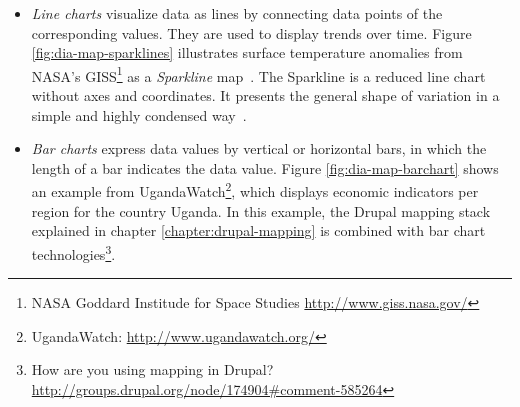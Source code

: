 \begin{itemize}
\begin{itemize}
\item \textit{Line charts} visualize data as lines by connecting data points of the corresponding values. They are used to display trends over time. Figure \ref{fig:dia-map-sparklines} illustrates surface temperature anomalies from NASA's GISS\footnote{NASA Goddard Institude for Space Studies \url{http://www.giss.nasa.gov/}} as a \textit{Sparkline} map~\cite{web:sparkmaps}. The Sparkline is a reduced line chart without axes and coordinates. It presents the general shape of variation in a simple and highly condensed way~\cite{wiki:sparkline}.

\item \textit{Bar charts} express data values by vertical or horizontal bars, in which the length of a bar indicates the data value. Figure \ref{fig:dia-map-barchart} shows an example from UgandaWatch\footnote{UgandaWatch: \url{http://www.ugandawatch.org/}}, which displays economic indicators per region for the country Uganda. In this example, the Drupal mapping stack explained in chapter \ref{chapter:drupal-mapping} is combined with bar chart technologies\footnote{How are you using mapping in Drupal? \url{http://groups.drupal.org/node/174904\#comment-585264}}.


\end{itemize}
\end{itemize}
